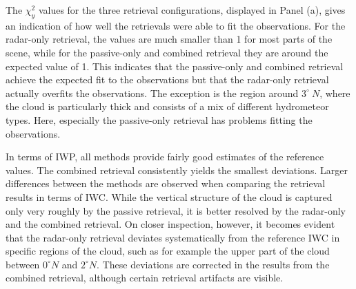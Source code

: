 \documentclass[journal abbreviation, manuscript]{copernicus}
\begin{document}
The $\chi^2_y$ values for the three retrieval configurations, displayed in Panel
(a), gives an indication of how well the retrievals were able to fit the
observations. For the radar-only retrieval, the values are much smaller than 1
for most parts of the scene, while for the passive-only and combined retrieval
they are around the expected value of 1. This indicates that the passive-only
and combined retrieval achieve the expected fit to the observations but that the
radar-only retrieval actually overfits the observations. The exception is the
region around $3^\circ\ N$, where the cloud is particularly thick and consists
of a mix of different hydrometeor types. Here, especially the passive-only
retrieval has problems fitting the observations.

In terms of IWP, all methods provide fairly good estimates of the reference
values. The combined retrieval consistently yields the smallest deviations.
Larger differences between the methods are observed when comparing the retrieval
results in terms of IWC. While the vertical structure of the cloud is captured
only very roughly by the passive retrieval, it is better resolved by the
radar-only and the combined retrieval. On closer inspection, however, it becomes
evident that the radar-only retrieval deviates systematically from the reference
IWC in specific regions of the cloud, such as for example the upper part of the
cloud between $0^\circ N$ and $2^\circ N$. These deviations are corrected in the
results from the combined retrieval, although certain retrieval artifacts are
visible.
\end{document}
